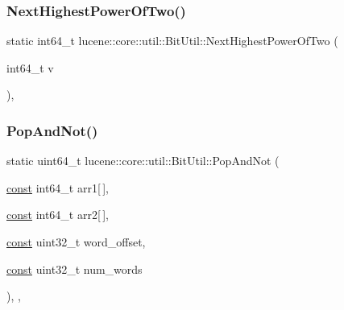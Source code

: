 \mbox{\label{classlucene_1_1core_1_1util_1_1BitUtil_af25b05dbc6c2442598bf2928d56a59d5}} 
\subsubsection{\texorpdfstring{Next\+Highest\+Power\+Of\+Two()}{NextHighestPowerOfTwo()}}
{\footnotesize\ttfamily static int64\+\_\+t lucene\+::core\+::util\+::\+Bit\+Util\+::\+Next\+Highest\+Power\+Of\+Two (\begin{DoxyParamCaption}\item[{int64\+\_\+t}]{v }\end{DoxyParamCaption})\hspace{0.3cm}{\ttfamily [inline]}, {\ttfamily [static]}}

\mbox{\label{classlucene_1_1core_1_1util_1_1BitUtil_ac247f117af6266225cfe030b62eb3a87}} 
\subsubsection{\texorpdfstring{Pop\+And\+Not()}{PopAndNot()}}
{\footnotesize\ttfamily static uint64\+\_\+t lucene\+::core\+::util\+::\+Bit\+Util\+::\+Pop\+And\+Not (\begin{DoxyParamCaption}\item[{\mbox{\hyperlink{ZlibCrc32_8h_a2c212835823e3c54a8ab6d95c652660e}{const}} int64\+\_\+t}]{arr1\mbox{[}$\,$\mbox{]},  }\item[{\mbox{\hyperlink{ZlibCrc32_8h_a2c212835823e3c54a8ab6d95c652660e}{const}} int64\+\_\+t}]{arr2\mbox{[}$\,$\mbox{]},  }\item[{\mbox{\hyperlink{ZlibCrc32_8h_a2c212835823e3c54a8ab6d95c652660e}{const}} uint32\+\_\+t}]{word\+\_\+offset,  }\item[{\mbox{\hyperlink{ZlibCrc32_8h_a2c212835823e3c54a8ab6d95c652660e}{const}} uint32\+\_\+t}]{num\+\_\+words }\end{DoxyParamCaption})\hspace{0.3cm}{\ttfamily [inline]}, {\ttfamily [static]}, {\ttfamily [noexcept]}}

